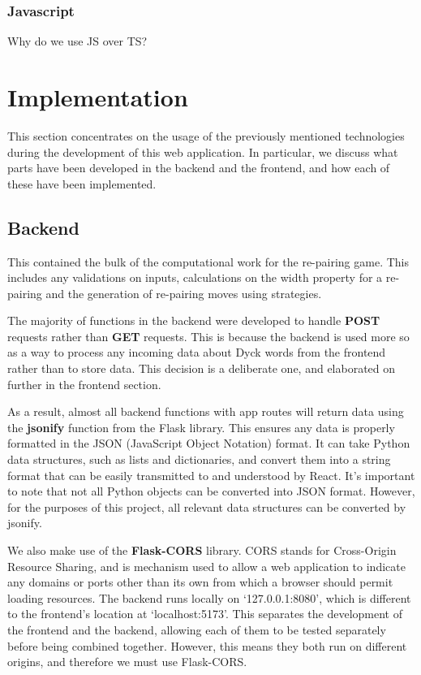 \subsubsection{Javascript}
Why do we use JS over TS?

\section{Implementation}
This section concentrates on the usage of the previously mentioned technologies during the development of this web application. In particular, we discuss what parts have been developed in the backend and the frontend, and how each of these have been implemented.

\subsection{Backend}
This contained the bulk of the computational work for the re-pairing game. This includes any validations on inputs, calculations on the width property for a re-pairing and the generation of re-pairing moves using strategies.

\par\null\par
\noindent The majority of functions in the backend were developed to handle \textbf{POST} requests rather than \textbf{GET} requests. This is because the backend is used more so as a way to process any incoming data about Dyck words from the frontend rather than to store data. This decision is a deliberate one, and elaborated on further in the frontend section.

\par\null\par
\noindent As a result, almost all backend functions with app routes will return data using the \textbf{jsonify} function from the Flask library. This ensures any data is properly formatted in the JSON (JavaScript Object Notation) format. It can take Python data structures, such as lists and dictionaries, and convert them into a string format that can be easily transmitted to and understood by React. It's important to note that not all Python objects can be converted into JSON format. However, for the purposes of this project, all relevant data structures can be converted by jsonify.

\par\null\par
\noindent We also make use of the \textbf{Flask-CORS} library. CORS stands for Cross-Origin Resource Sharing, and is mechanism used to allow a web application to indicate any domains or ports other than its own from which a browser should permit loading resources\cite{}. The backend runs locally on {`127.0.0.1:8080'}, which is different to the frontend's location at {`localhost:5173'}. This separates the development of the frontend and the backend, allowing each of them to be tested separately before being combined together. However, this means they both run on different origins, and therefore we must use Flask-CORS. 

